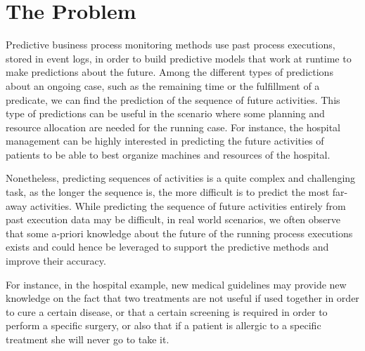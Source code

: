 
\section{The Problem} %
\label{sec:the_problem}
Predictive business process monitoring methods use past process executions, stored in event logs, in order to build predictive models that work at runtime to make predictions about the future.
Among the different types of predictions about an ongoing case, such as the remaining time or the fulfillment of a predicate, we can find the prediction of the sequence of future activities. This type of predictions can be useful in the scenario where some planning and resource allocation are needed for the running case.
For instance, the hospital management can be highly interested in predicting the future activities of patients to be able to best organize machines and resources of the hospital.



Nonetheless, predicting sequences of activities is a quite complex and challenging task, as the longer the sequence is, the more difficult is to predict the most far-away activities.
While predicting the sequence of future activities entirely from past execution data may be difficult, in real world scenarios, we often observe that some a-priori knowledge about the future of the running process executions exists and could hence be leveraged to support the predictive methods and improve their accuracy.


For instance, in the hospital example, new medical guidelines may provide new knowledge on the fact that two treatments are not useful if used together in order to cure a certain disease, or that a certain screening is required in order to perform a specific surgery, or also that if a patient is allergic to a specific treatment she will never go to take it.


